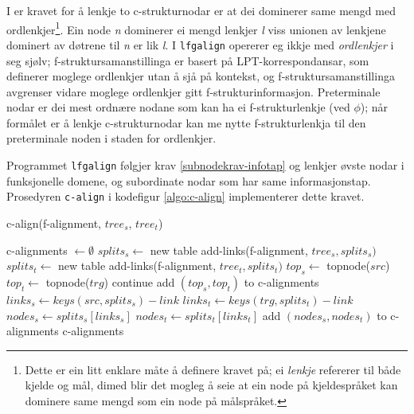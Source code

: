 \documentclass[11pt,a4paper,oneside,draft]{book}
\begin{document}
I \citet[s.~77]{dyvik2009lmp} er kravet for å lenkje to
c-strukturnodar er at dei dominerer same mengd med
ordlenkjer\footnote{Dette er ein litt enklare måte å definere kravet på; ei
        \emph{lenkje} refererer til både kjelde og mål, dimed blir det
        mogleg å seie at ein node på kjeldespråket kan dominere same
        mengd som ein node på målspråket. }. Ein node \emph{n} dominerer ei mengd lenkjer \emph{l} viss
unionen av lenkjene dominert av døtrene til \emph{n} er lik \emph{l}. I
\texttt{lfgalign} opererer eg ikkje med \emph{ordlenkjer} i seg sjølv;
f-struktursamanstillinga er basert på LPT-korrespondansar, som
definerer moglege ordlenkjer utan å sjå på kontekst, og
f-struktursamanstillinga avgrenser vidare moglege ordlenkjer gitt
f-strukturinformasjon. Preterminale nodar er dei mest ordnære nodane
som kan ha ei f-strukturlenkje (ved $\phi$); når formålet er å lenkje
c-strukturnodar kan me nytte f-strukturlenkja til den preterminale
noden i staden for ordlenkjer.

Programmet \texttt{lfgalign} følgjer krav \ref{subnodekrav-infotap} og
lenkjer øvste nodar i funksjonelle domene, og subordinate nodar som
har same informasjonstap. Prosedyren \texttt{c-align} i kodefigur
\ref{algo:c-align} implementerer dette kravet. 

   \begin{algorithm}[]
     \caption{c-align(f-alignment, $tree_s$, $tree_t$)}
     \label{algo:c-align}
      
     c-alignments $\gets \emptyset$ \;
     $splits_s \gets$ new table \;
     add-links(f-alignment, $tree_s, splits_s)$  \;
     $splits_t \gets$ new table \;
     add-links(f-alignment, $tree_t, splits_t)$  \;
      {
       $top_s \gets$ topnode($src$) \;
       $top_t \gets$ topnode($trg$) \;
        { continue\; }
       add $(top_s,top_t)$ to c-alignments \;
        {
          {
           $links_s \gets keys(src, splits_s) - link$ \;
           $links_t \gets keys(trg, splits_t) - link$ \;
           $nodes_s \gets splits_s[links_s]$ \;
           $nodes_t \gets splits_t[links_t]$ \;
            {
             add $(nodes_s,nodes_t)$ to c-alignments \;
           }
         }
        }
      }
      \Return c-alignments \;
      \end{algorithm}    
\end{document}
